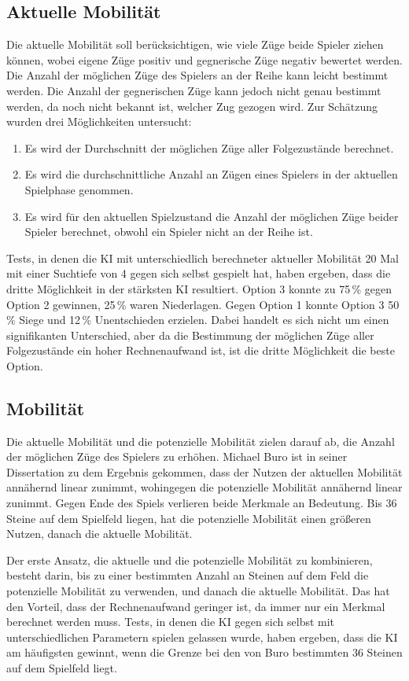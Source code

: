 \subsection{Aktuelle Mobilität}
Die aktuelle Mobilität soll berücksichtigen, wie viele Züge beide Spieler ziehen können, wobei eigene Züge positiv und
gegnerische Züge negativ bewertet werden. Die Anzahl der möglichen Züge des Spielers an der Reihe kann leicht bestimmt
werden. Die Anzahl der gegnerischen Züge kann jedoch nicht genau bestimmt werden, da noch nicht bekannt ist, welcher Zug
gezogen wird. Zur Schätzung wurden drei Möglichkeiten untersucht:
\begin{enumerate}
    \item Es wird der Durchschnitt der möglichen Züge aller Folgezustände berechnet.
    \item Es wird die durchschnittliche Anzahl an Zügen eines Spielers in der aktuellen Spielphase genommen.
    \item Es wird für den aktuellen Spielzustand die Anzahl der möglichen Züge beider Spieler berechnet, obwohl ein
    Spieler nicht an der Reihe ist.
\end{enumerate}
Tests, in denen die KI mit unterschiedlich berechneter aktueller Mobilität 20 Mal mit einer Suchtiefe von 4 gegen sich
selbst gespielt hat, haben ergeben, dass die dritte Möglichkeit in der stärksten KI resultiert. Option 3 konnte zu
75\,\% gegen Option 2 gewinnen, 25\,\% waren Niederlagen. Gegen Option 1 konnte Option 3 50\,\% Siege und 12\,\%
Unentschieden erzielen. Dabei handelt es sich nicht um einen signifikanten Unterschied, aber da die Bestimmung der
möglichen Züge aller Folgezustände ein hoher Rechnenaufwand ist, ist die dritte Möglichkeit die beste Option.

\subsection{Mobilität}
Die aktuelle Mobilität und die potenzielle Mobilität zielen darauf ab, die Anzahl der möglichen Züge des Spielers zu
erhöhen. Michael Buro ist in seiner Dissertation zu dem Ergebnis gekommen, dass der Nutzen der aktuellen Mobilität
annähernd linear zunimmt, wohingegen die potenzielle Mobilität annähernd linear zunimmt. Gegen Ende des Spiels verlieren
beide Merkmale an Bedeutung. Bis 36 Steine auf dem Spielfeld liegen, hat die potenzielle Mobilität einen größeren
Nutzen, danach die aktuelle Mobilität. \cite[S.~20]{evaluationfunctions}

Der erste Ansatz, die aktuelle und die potenzielle Mobilität zu kombinieren, besteht darin, bis zu einer bestimmten
Anzahl an Steinen auf dem Feld die potenzielle Mobilität zu verwenden, und danach die aktuelle Mobilität. Das hat den
Vorteil, dass der Rechnenaufwand geringer ist, da immer nur ein Merkmal berechnet werden muss. Tests, in denen die KI
gegen sich selbst mit unterschiedlichen Parametern spielen gelassen wurde, haben ergeben, dass die KI am häufigsten
gewinnt, wenn die Grenze bei den von Buro bestimmten 36 Steinen auf dem Spielfeld liegt.

